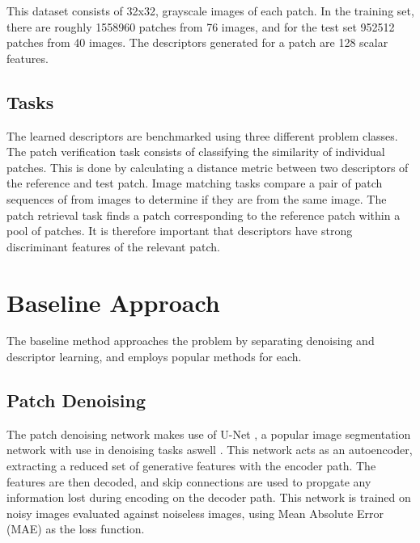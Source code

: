 \documentclass[10pt,twocolumn,letterpaper]{article}
\begin{document}
This dataset consists of 32x32, grayscale images of each patch.
In the training set, there are roughly 1558960 patches from 76 images, and for the test set 952512 patches from 40 images.
The descriptors generated for a patch are 128 scalar features.


\subsection{Tasks}

The learned descriptors are benchmarked using three different problem classes. 
The patch verification task consists of classifying the similarity of individual patches. This is done by calculating a distance metric between two descriptors of the reference and test patch.
Image matching tasks compare a pair of patch sequences of from images to determine if they are from the same image. 
The patch retrieval task finds a patch corresponding to the reference patch within a pool of patches. 
It is therefore important that descriptors have strong discriminant features of the relevant patch.

\section{Baseline Approach}


The baseline method approaches the problem by separating denoising and descriptor learning, and employs popular methods for each. 

\subsection{Patch Denoising}

The patch denoising network makes use of U-Net \cite{RonnebergerFB15}, a popular image segmentation network with use in denoising tasks aswell \cite{unet_example}. This network
acts as an autoencoder, extracting a reduced set of generative features with the encoder path. The features are then decoded, and skip connections are used to propgate any information lost during encoding on the decoder path. 
This network is trained on noisy images evaluated against noiseless images, using Mean Absolute Error (MAE) as the loss function.%
\end{document}
